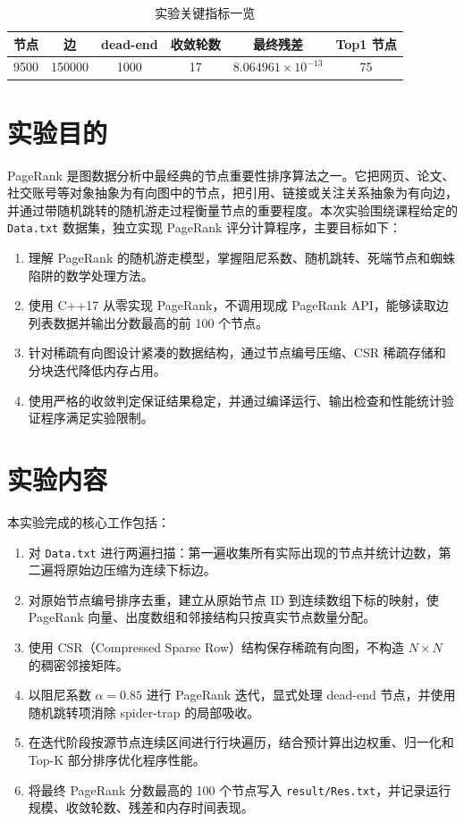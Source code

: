 \documentclass[UTF8,a4paper,10pt]{ctexart}
\newcommand{\xiaosi}{\fontsize{12pt}{20pt}\selectfont}
\begin{document}
\begin{table}[H]
  \centering
  \caption{实验关键指标一览}
  \begin{tabular}{c c c c c c}
    \toprule
    \textbf{节点} & \textbf{边} & \textbf{dead-end} & \textbf{收敛轮数} & \textbf{最终残差} & \textbf{Top1 节点} \\
    \midrule
    9500 & 150000 & 1000 & 17 & $8.064961\times10^{-13}$ & 75 \\
    \bottomrule
  \end{tabular}
\end{table}

\section{实验目的}
\xiaosi

PageRank 是图数据分析中最经典的节点重要性排序算法之一。它把网页、论文、社交账号等对象抽象为有向图中的节点，把引用、链接或关注关系抽象为有向边，并通过带随机跳转的随机游走过程衡量节点的重要程度。本次实验围绕课程给定的 \texttt{Data.txt} 数据集，独立实现 PageRank 评分计算程序，主要目标如下：

\begin{enumerate}
  \item 理解 PageRank 的随机游走模型，掌握阻尼系数、随机跳转、死端节点和蜘蛛陷阱的数学处理方法。
  \item 使用 C++17 从零实现 PageRank，不调用现成 PageRank API，能够读取边列表数据并输出分数最高的前 100 个节点。
  \item 针对稀疏有向图设计紧凑的数据结构，通过节点编号压缩、CSR 稀疏存储和分块迭代降低内存占用。
  \item 使用严格的收敛判定保证结果稳定，并通过编译运行、输出检查和性能统计验证程序满足实验限制。
\end{enumerate}

\section{实验内容}
\xiaosi

本实验完成的核心工作包括：

\begin{enumerate}
  \item 对 \texttt{Data.txt} 进行两遍扫描：第一遍收集所有实际出现的节点并统计边数，第二遍将原始边压缩为连续下标边。
  \item 对原始节点编号排序去重，建立从原始节点 ID 到连续数组下标的映射，使 PageRank 向量、出度数组和邻接结构只按真实节点数量分配。
  \item 使用 CSR（Compressed Sparse Row）结构保存稀疏有向图，不构造 $N \times N$ 的稠密邻接矩阵。
  \item 以阻尼系数 $\alpha=0.85$ 进行 PageRank 迭代，显式处理 dead-end 节点，并使用随机跳转项消除 spider-trap 的局部吸收。
  \item 在迭代阶段按源节点连续区间进行行块遍历，结合预计算出边权重、归一化和 Top-K 部分排序优化程序性能。
  \item 将最终 PageRank 分数最高的 100 个节点写入 \texttt{result/Res.txt}，并记录运行规模、收敛轮数、残差和内存时间表现。
\end{enumerate}
\end{document}
